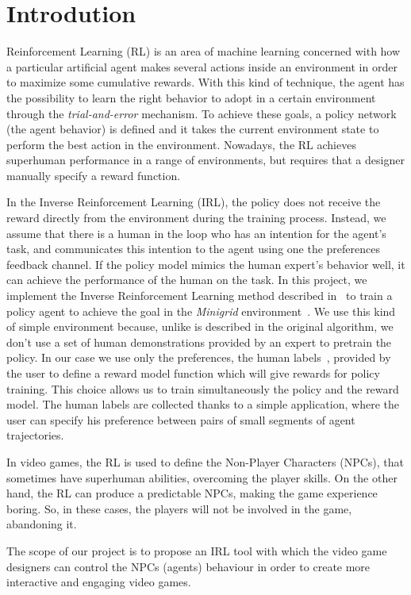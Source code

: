 \section{Introdution}
Reinforcement Learning (RL) is an area of machine learning concerned with how a particular artificial agent makes several actions inside an environment in order to maximize some cumulative rewards. With this kind of technique, the agent has the possibility to learn the right behavior to adopt in a certain environment through the \textsl{trial-and-error} mechanism. To achieve these goals, a policy network (the agent behavior) is defined and it takes the current environment state to perform the best action in the environment. Nowadays, the RL achieves superhuman performance in a range of environments, but requires that a designer manually specify a reward function.

In the Inverse Reinforcement Learning (IRL), the policy does not receive the reward directly from the environment during the training process. Instead,  we assume that there is a human in the loop who has an intention for the agent’s task, and communicates this intention to the agent using one the preferences feedback channel.  If the policy model mimics the human expert’s behavior well, it can achieve the performance of the human on the task. In this project, we implement the Inverse Reinforcement Learning method described in\ \cite{NIPS2018_8025} to train a policy agent to achieve the goal in the \textsl{Minigrid} environment\ \cite{gym_minigrid}. We use this kind of simple environment because, unlike is described in the original algorithm, we don't use a set of human demonstrations provided by an expert to pretrain the policy. In our case we use only the preferences, the human labels\ \cite{NIPS2018_8025}, provided by the user to define a reward model function which will give rewards for policy training. This choice allows us to train simultaneously the policy and the reward model. 
The human labels are collected thanks to a simple application, where the user can specify his preference between pairs of small segments of agent trajectories.
 
 In video games, the RL is used to define the Non-Player Characters (NPCs), that sometimes have superhuman abilities, overcoming the player skills. On the other hand, the RL can produce a predictable NPCs, making the game experience boring. So, in these cases, the players will not be involved in the game, abandoning it. 
 
 The scope of our project is to propose an IRL tool with which the video game designers can control the NPCs (agents) behaviour in order to create more interactive and engaging video games.
 
